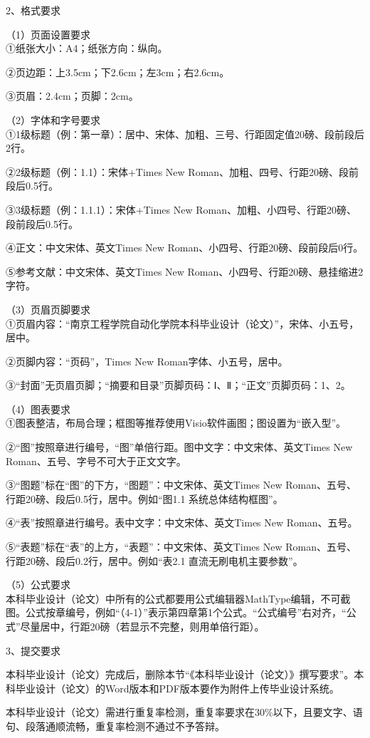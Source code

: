 \documentclass[UTF8,zihao=-4,openany,oneside]{ctexbook}
\begin{document}
2、格式要求

\noindent （1）页面设置要求\\

①纸张大小：A4；纸张方向：纵向。

②页边距：上3.5cm；下2.6cm；左3cm；右2.6cm。

③页眉：2.4cm；页脚：2cm。

\noindent （2）字体和字号要求\\

①1级标题（例：第一章）：居中、宋体、加粗、三号、行距固定值20磅、段前段后2行。

②2级标题（例：1.1）：宋体+Times New Roman、加粗、四号、行距20磅、段前段后0.5行。

③3级标题（例：1.1.1）：宋体+Times New Roman、加粗、小四号、行距20磅、段前段后0.5行。

④正文：中文宋体、英文Times New Roman、小四号、行距20磅、段前段后0行。

⑤参考文献：中文宋体、英文Times New Roman、小四号、行距20磅、悬挂缩进2字符。

\noindent （3）页眉页脚要求\\

①页眉内容：“南京工程学院自动化学院本科毕业设计（论文）”，宋体、小五号，居中。

②页脚内容：“页码”，Times New Roman字体、小五号，居中。

③“封面”无页眉页脚；“摘要和目录”页脚页码：Ⅰ、Ⅱ；“正文”页脚页码：1、2。

\noindent （4）图表要求\\

①图表整洁，布局合理；框图等推荐使用Visio软件画图；图设置为“嵌入型”。

②“图”按照章进行编号，“图”单倍行距。图中文字：中文宋体、英文Times New Roman、五号、字号不可大于正文文字。

③“图题”标在“图”的下方，“图题”：中文宋体、英文Times New Roman、五号、行距20磅、段后0.5行，居中。例如“图1.1 系统总体结构框图”。

④“表”按照章进行编号。表中文字：中文宋体、英文Times New Roman、五号。

⑤“表题”标在“表”的上方，“表题”：中文宋体、英文Times New Roman、五号、行距20磅、段后0.2行，居中。例如“表2.1 直流无刷电机主要参数”。

\noindent （5）公式要求\\

本科毕业设计（论文）中所有的公式都要用公式编辑器MathType编辑，不可截图。公式按章编号，例如“（4-1）”表示第四章第1个公式。“公式编号”右对齐，“公式”尽量居中，行距20磅（若显示不完整，则用单倍行距）。

3、提交要求

本科毕业设计（论文）完成后，删除本节“《本科毕业设计（论文）》撰写要求”。本科毕业设计（论文）的Word版本和PDF版本要作为附件上传毕业设计系统。

本科毕业设计（论文）需进行重复率检测，重复率要求在30\%以下，且要文字、语句、段落通顺流畅，重复率检测不通过不予答辩。
\end{document}
